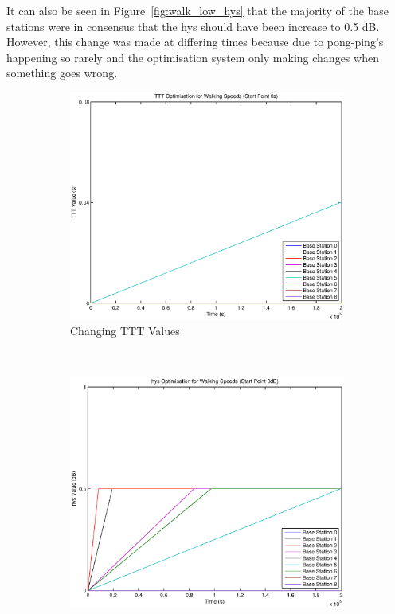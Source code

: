 It can also be seen in Figure~\ref{fig:walk_low_hys} that the majority of the base stations were in consensus that the hys should have been increase to 0.5 dB. However, this change was made at differing times because due to pong-ping’s happening so rarely and the optimisation system only making changes when something goes wrong.
\begin{figure}[H]
        \centering
        \begin{subfigure}[b]{0.49\textwidth}
                \includegraphics[width=\textwidth]{figures/walking_figures/low/long_ttt.eps}
                \caption{Changing TTT Values}
                \label{fig:walk_low_ttt}
        \end{subfigure}%
        ~ %
        \begin{subfigure}[b]{0.49\textwidth}
                \includegraphics[width=\textwidth]{figures/walking_figures/low/long_hys.eps}

\end{subfigure}
\end{figure}
